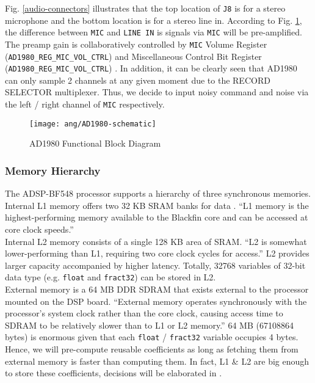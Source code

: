 Fig. \ref{audio-connectors} illustrates that the top location of \texttt{J8} is for a stereo microphone and the bottom location is for a stereo line in. According to Fig. \ref{AD1980-schematic}, the difference between \texttt{MIC} and \texttt{LINE IN} is signals via \texttt{MIC} will be pre-amplified. The preamp gain is collaboratively controlled by \texttt{MIC} Volume Register (\texttt{AD1980\_REG\_MIC\_VOL\_CTRL}) and Miscellaneous Control Bit Register (\texttt{AD1980\_REG\_MIC\_VOL\_CTRL}) \cite{AC97-codec}. In addition, it can be clearly seen that AD1980 can only sample 2 channels at any given moment due to the RECORD SELECTOR multiplexer. Thus, we decide to input noisy command and noise via the left / right channel of \texttt{MIC} respectively.

\begin{figure}[H]
\centering
\texttt{[image: ang/AD1980-schematic]}
\caption{AD1980 Functional Block Diagram}
\label{AD1980-schematic}
\end{figure}


\subsubsection{Memory Hierarchy}
The ADSP-BF548 processor supports a hierarchy of three synchronous memories.\\

Internal L1 memory offers two 32 KB SRAM banks for data \cite{bf54x-hardware}. ``L1 memory is the highest-performing memory available to the Blackfin core and can be accessed at core clock speeds.''\cite{start-with-bf548}\\

Internal L2 memory consists of a single 128 KB area of SRAM. ``L2 is somewhat lower-performing than L1, requiring two core clock cycles for access.'' L2 provides larger capacity accompanied by higher latency. \cite{start-with-bf548} Totally, 32768 variables of 32-bit data type (e.g. \texttt{float} and \texttt{fract32}) can be stored in L2.\\

External memory is a 64 MB DDR SDRAM that exists external to the processor mounted on the DSP board. ``External memory operates synchronously with the processor's system clock rather than the core clock, causing access time to SDRAM to be relatively slower than to L1 or L2 memory.''\cite{start-with-bf548} 64 MB (67108864 bytes) is enormous given that each \texttt{float} / \texttt{fract32} variable occupies 4 bytes. Hence, we will pre-compute reusable coefficients as long as fetching them from external memory is faster than computing them. In fact, L1 \& L2 are big enough to store these coefficients, decisions will be elaborated in .

